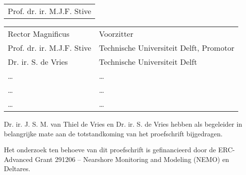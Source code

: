 \thispagestyle{empty}

\hfill

\vfill

\noindent {}

\begin{table}[h]
  \begin{tabular}{l}
    Prof. dr. ir. M.J.F. Stive \\
  \end{tabular}
\end{table}

\noindent {}

\begin{table}[h]
  \begin{tabular}{ll}
    Rector Magnificus          & Voorzitter \\
    Prof. dr. ir. M.J.F. Stive & Technische Universiteit Delft, Promotor \\
    Dr. ir. S. de Vries        & Technische Universiteit Delft \\
    \dots                      & \dots \\
    \dots                      & \dots \\
    \dots                      & \dots \\
  \end{tabular}
\end{table}

\vfill

\noindent Dr. ir. J. S. M. van Thiel de Vries en Dr. ir. S. de Vries
hebben als begeleider in belangrijke mate aan de totstandkoming van
het proefschrift bijgedragen.

\bigskip

\noindent Het onderzoek ten behoeve van dit proefschrift is
gefinancieerd door de ERC-Advanced Grant 291206 -- Nearshore
Monitoring and Modeling (NEMO) en Deltares.

